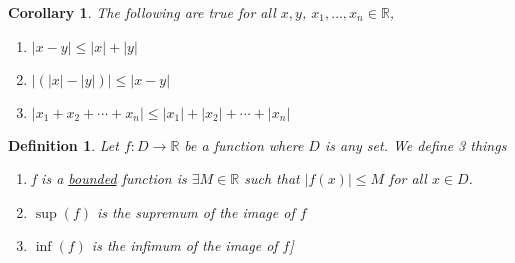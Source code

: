 \documentclass{article}
\newtheorem{definition}[theorem]{Definition}
\newtheorem{corollary}[theorem]{Corollary}
\begin{document}
\begin{corollary}
    The following are true for all $x,y$, $x_1,\dots, x_n \in \mathbb{R}$, 
    \begin{enumerate}
        \item $|x - y| \leq |x| + |y|$
        \item $|(|x| - |y|)| \leq |x-y|$
        \item $|x_1 + x_2 + \cdots + x_n| \leq |x_1| + |x_2| + \cdots + |x_n|$
    \end{enumerate}
\end{corollary}

\begin{definition}
    Let $f: D \rightarrow \mathbb{R}$ be a function where $D$ is any set. We define 3 things
    \begin{enumerate}
        \item f is a \underline{bounded} function is $\exists M \in \mathbb{R}$ such that $|f(x)| \leq M$ for all $x \in D$. 
        \item $\sup(f)$ is the supremum of the image of $f$
        \item $\inf(f)$ is the infimum of the image of $f$]
    \end{enumerate}
\end{definition}
\end{document}
